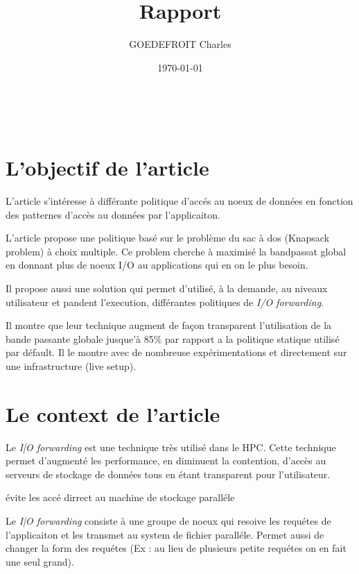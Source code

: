 \documentclass[10pt, a4paper]{article}
\title{Rapport}
\author{GOEDEFROIT Charles}
\date{\today}
\begin{document}
\begin{titlepage}
	\centering
  \ {} %
	\vfill
	\vspace{1cm}
	{\scshape\Huge\MyTitle\par}
	\vspace{0.5cm}
	{\Large\MySubject\par}
	\vspace{1cm}
	\MyAuthor
	\vfill
	{\large\MyDate\par}
\end{titlepage}

\newpage


\section{L'objectif de l'article}

L'article s'intéresse à différante politique d'accés au noeux de données en fonction des
patternes d'accès au données par l'applicaiton.

L'article propose une politique basé sur le problème du sac à dos (Knapsack problem) à choix
multiple. Ce problem cherche à maximisé la bandpassat global en donnant plus de noeux I/O au
applications qui en on le plus besoin.

Il propose aussi une solution qui permet d'utilisé, à la demande, au niveaux utilisateur et
pandent l'execution, différantes politiques de \emph{I/O forwarding}.

Il montre que leur technique augment de façon transparent l'utilisation de la bande passante
globale jusque'à 85\% par rapport a la politique statique utilisé par défault. Il le montre
avec de nombreuse expérimentations et directement sur une infrastructure (live setup).



\section{Le context de l'article}

Le \emph{I|O forwarding} est une technique très utilisé dans le HPC. Cette technique permet
d'augmenté les performance, en diminuent la contention, d'accès au serveurs de stockage de
données tous en étant transparent pour l'utilisateur.

évite les accé dirrect au machine de stockage paralléle

Le \emph{I|O forwarding} consiste à une groupe de noeux qui resoive les requétes de
l'applicaiton et les transmet au system de fichier paralléle. Permet aussi de changer la form
des requétes (Ex : au lieu de plusieurs petite requétes on en fait une seul grand).
\end{document}

